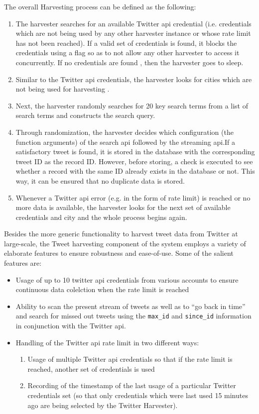 \documentclass[11pt, oneside]{article}
\begin{document}
The overall Harvesting process can be defined as the following:
\begin{enumerate}
    \item The harvester searches for an available Twitter \acrshort{api} credential (i.e. credentials which are not being used by any other harvester instance or whose rate limit has not been reached). If a valid set of credentials is found, it blocks the credentials using a flag so as to not allow any other harvester to access it concurrently. If no credentials are found , then the harvester goes to sleep.
    \item Similar to the Twitter \acrshort{api} credentials, the harvester looks for cities which are not being used for harvesting .
    \item Next, the harvester randomly searches for 20 key search terms from a list of search terms and constructs the search query.
    \item Through randomization, the harvester decides which configuration (the function arguments) of the search \acrshort{api} followed by the streaming \acrshort{api}.If a satisfactory tweet is found, it is stored in the database with the corresponding tweet ID as the record ID. However, before storing, a check is executed to see whether a record with the same ID already exists in the database or not. This way, it can be ensured that no duplicate data is stored.
    \item Whenever a Twitter \acrshort{api} error (e.g. in the form of rate limit) is reached or no more data is available, the harvester looks for the next set of available credentials and city and the whole process begins again.
\end{enumerate}
Besides the more generic functionality to harvest tweet data from Twitter at large-scale, the Tweet harvesting component of the system employs a variety of elaborate features to ensure robustness and ease-of-use. 
\newline
Some of the salient features are:
\begin{itemize}
    \item Usage of up to 10 twitter \acrshort{api} credentials from various accounts to ensure continuous data colelction when the rate limit is reached
    \item Ability to scan the present stream of tweets as well as to \enquote{go back in time} and search for missed out tweets using the \texttt{max\_id} and \texttt{since\_id} information in conjunction with the Twitter \acrshort{api}.
    \item Handling of the Twitter \acrshort{api} rate limit in two different ways:
    \begin{enumerate}
        \item Usage of multiple Twitter \acrshort{api} credentials so that if the rate limit is reached, another set of credentials is used
        \item Recording of the timestamp of the last usage of a particular Twitter credentials set (so that only credentials which were last used 15 minutes ago are being selected by the Twitter Harvester). 
    \end{enumerate}
\end{itemize}
\end{document}
